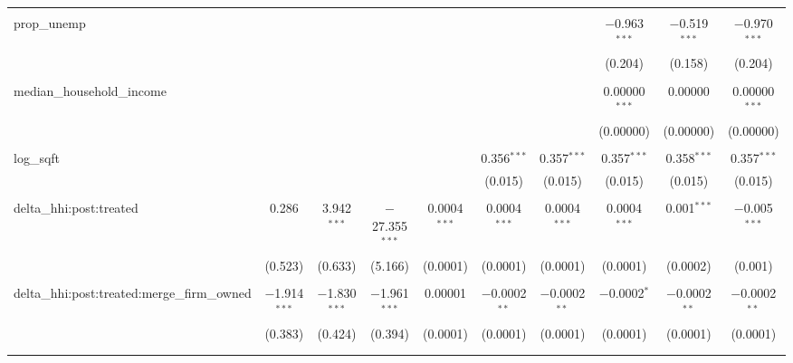 \begin{table}[H]
{\begin{tabular}{@{\extracolsep{5pt}}lccccccccc}
   & & & & & & & & & \\  

  prop\_unemp &  &  &  &  &  &  & $-$0.963$^{***}$ & $-$0.519$^{***}$ & $-$0.970$^{***}$ \\  

   &  &  &  &  &  &  & (0.204) & (0.158) & (0.204) \\  

   & & & & & & & & & \\  

  median\_household\_income &  &  &  &  &  &  & 0.00000$^{***}$ & 0.00000 & 0.00000$^{***}$ \\  

   &  &  &  &  &  &  & (0.00000) & (0.00000) & (0.00000) \\  

   & & & & & & & & & \\  

  log\_sqft &  &  &  &  & 0.356$^{***}$ & 0.357$^{***}$ & 0.357$^{***}$ & 0.358$^{***}$ & 0.357$^{***}$ \\  

   &  &  &  &  & (0.015) & (0.015) & (0.015) & (0.015) & (0.015) \\  

   & & & & & & & & & \\  

  delta\_hhi:post:treated & 0.286 & 3.942$^{***}$ & $-$27.355$^{***}$ & 0.0004$^{***}$ & 0.0004$^{***}$ & 0.0004$^{***}$ & 0.0004$^{***}$ & 0.001$^{***}$ & $-$0.005$^{***}$ \\  

   & (0.523) & (0.633) & (5.166) & (0.0001) & (0.0001) & (0.0001) & (0.0001) & (0.0002) & (0.001) \\  

   & & & & & & & & & \\  

  delta\_hhi:post:treated:merge\_firm\_owned & $-$1.914$^{***}$ & $-$1.830$^{***}$ & $-$1.961$^{***}$ & 0.00001 & $-$0.0002$^{**}$ & $-$0.0002$^{**}$ & $-$0.0002$^{*}$ & $-$0.0002$^{**}$ & $-$0.0002$^{**}$ \\  

   & (0.383) & (0.424) & (0.394) & (0.0001) & (0.0001) & (0.0001) & (0.0001) & (0.0001) & (0.0001) \\  

   & & & & & & & & & \\  

 \hline \\[-1.8ex]  


\end{tabular}}
\end{table}
